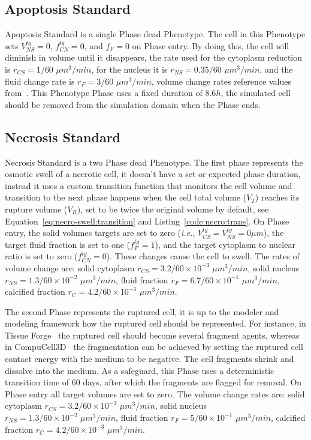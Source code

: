 \subsection{Apoptosis Standard}\label{sec:predef:apopto}
Apoptosis Standard is a single Phase dead Phenotype. The cell in this Phenotype sets $V^{tg}_{NS}=0$, $f^{tg}_{CN}=0$, and $f_F=0$ on Phase entry. By doing this, the cell will diminish in volume until it disappears, the rate used for the cytoplasm reduction is  $r_{CS}=1/60\,\,\mu m^3/min$, for the nucleus it is $r_{NS}=0.35/60\,\,\mu m^3/min$, and the fluid change rate is $r_F=3/60\,\,\mu m^3/min$, volume change rates reference values from~\cite{macklin_patient-calibrated_2012,macklin_modeling_2013}. This Phenotype Phase uses a fixed duration of $8.6h$, the simulated cell should be removed from the simulation domain when the Phase ends.

\subsection{Necrosis Standard}\label{sec:predef:necro}
Necrosis Standard is a two Phase dead Phenotype. The first phase represents the osmotic swell of a necrotic cell, it doesn't have a set or expected phase duration, instead it uses a custom transition function that monitors the cell volume and transition to the next phase happens when the cell total volume ($V_T$) reaches its rupture volume ($V_R$), set to be twice the original volume by default, see Equation~\ref{eq:necro-swell:transition} and Listing~\ref{code:necro:trans}. On Phase entry, the solid volumes targets are set to zero (\textit{i.e.}, $V^{tg}_{CS}=V^{tg}_{NS}=0\mu m$), the target fluid fraction is set to one ($f_{F}^{tg}=1$), and the target cytoplasm to nuclear ratio is set to zero ($f^{tg}_{CN}=0$). These changes cause the cell to swell. The rates of volume change are: solid cytoplasm $r_{CS} = 3.2 / 60 \times 10^{-3}\,\,\mu m^3/min$, solid nucleus $r_{NS}=1.3 / 60\times 10^{-2}\,\,\mu m^3/min$, fluid fraction $r_F=6.7/60\times 10^{-1}\,\,\mu m^3/min$, calcified fraction $r_C=4.2 / 60\times 10^{-3}\,\,\mu m^3/min$. 

The second Phase represents the ruptured cell, it is up to the modeler and modeling framework how the ruptured cell should be represented. For instance, in Tissue Forge~\cite{sego_tissue_2022} the ruptured cell should become several fragment agents, whereas in CompuCell3D~\cite{swat_multi-scale_2012} the fragmentation can be achieved by setting the ruptured cell contact energy with the medium to be negative. The cell fragments shrink and dissolve into the medium. As a safeguard, this Phase uses a deterministic transition time of 60 days, after which the fragments are flagged for removal. On Phase entry all target volumes are set to zero. The volume change rates are: solid cytoplasm $r_{CS} = 3.2 / 60 \times 10^{-3}\,\,\mu m^3/min$, solid nucleus $r_{NS}=1.3 / 60\times 10^{-2}\,\,\mu m^3/min$, fluid fraction $r_F=5/60\times 10^{-1}\,\,\mu m^3/min$, calcified fraction $r_C=4.2 / 60\times 10^{-3}\,\,\mu m^3/min$. 

